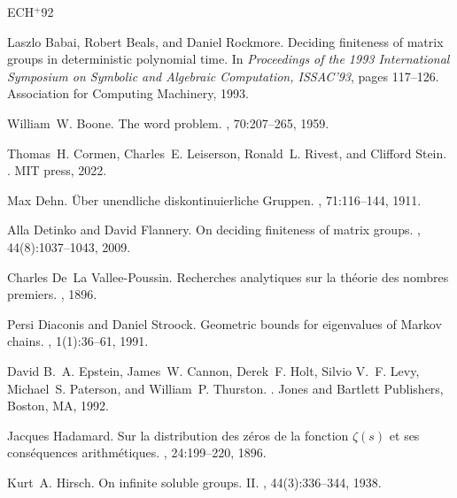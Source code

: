 \documentclass{article}
\theoremstyle{plain}
\theoremstyle{definition}
\begin{document}

\newcommand{\etalchar}[1]{$^{#1}$}
\begin{thebibliography}{ECH{\etalchar{+}}92}

Laszlo Babai, Robert Beals, and Daniel Rockmore.
\newblock Deciding finiteness of matrix groups in deterministic polynomial
  time.
\newblock In {\em Proceedings of the 1993 International Symposium on Symbolic
  and Algebraic Computation, ISSAC'93}, pages 117--126. Association for
  Computing Machinery, 1993.

William~W. Boone.
\newblock The word problem.
, 70:207--265, 1959.

Thomas~H. Cormen, Charles~E. Leiserson, Ronald~L. Rivest, and Clifford Stein.
.
\newblock MIT press, 2022.

Max Dehn.
\newblock Über unendliche diskontinuierliche {G}ruppen.
, 71:116--144, 1911.

Alla Detinko and David Flannery.
\newblock On deciding finiteness of matrix groups.
, 44(8):1037--1043, 2009.

Charles De~La Vallee-Poussin.
\newblock Recherches analytiques sur la th{\'e}orie des nombres premiers.
, 1896.

Persi Diaconis and Daniel Stroock.
\newblock Geometric bounds for eigenvalues of {M}arkov chains.
, 1(1):36--61, 1991.

\bibitem[ECH{\etalchar{+}}92]{1992:Epsteinetal}
David B.~A. Epstein, James~W. Cannon, Derek~F. Holt, Silvio V.~F. Levy,
  Michael~S. Paterson, and William~P. Thurston.
.
\newblock Jones and Bartlett Publishers, Boston, MA, 1992.

Jacques Hadamard.
\newblock Sur la distribution des z{\'e}ros de la fonction $\zeta (s) $ et ses
  cons{\'e}quences arithm{\'e}tiques.
, 24:199--220, 1896.

Kurt~A. Hirsch.
\newblock On infinite soluble groups. {II}.
, 44(3):336--344, 1938.


\end{thebibliography}
\end{document}
